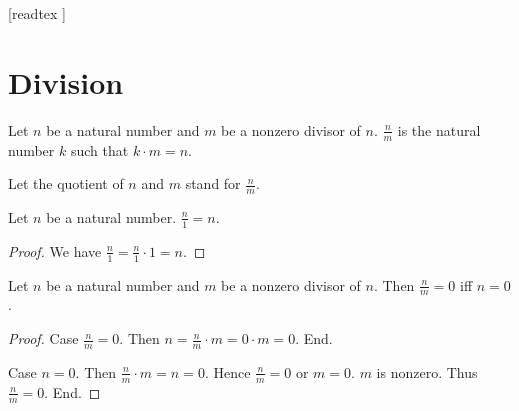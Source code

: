 \documentclass[10pt]{article}
\begin{document}
  \begin{imports}
    \begin{forthel}
      [readtex ]
    \end{forthel}
  \end{imports}


  \section*{Division}

  \begin{forthel}
    \begin{definition}[id=ARITHMETIC_14_2313654268297915,printid]
      Let $n$ be a natural number and $m$ be a nonzero divisor of $n$.
      $\frac{n}{m}$ is the natural number $k$ such that $k \cdot m = n$.
    \end{definition}

    Let the quotient of $n$ and $m$ stand for $\frac{n}{m}$.
  \end{forthel}

  \begin{forthel}
    \begin{proposition}[id=ARITHMETIC_14_0843793254698710,printid]
      Let $n$ be a natural number.
      $\frac{n}{1} = n$.
    \end{proposition}
    \begin{proof}
      We have $\frac{n}{1}
        = \frac{n}{1} \cdot 1
        = n$.
    \end{proof}
  \end{forthel}

  \begin{forthel}
    \begin{proposition}[id=ARITHMETIC_14_1254235698632545,printid]
      Let $n$ be a natural number and $m$ be a nonzero divisor of $n$.
      Then $\frac{n}{m} = 0$ iff $n = 0$.
    \end{proposition}
    \begin{proof}
      Case $\frac{n}{m} = 0$.
        Then $n
          = \frac{n}{m} \cdot m
          = 0 \cdot m
          = 0$.
      End.

      Case $n = 0$.
        Then $\frac{n}{m} \cdot m
          = n
          = 0$.
        Hence $\frac{n}{m} = 0$ or $m = 0$.
        $m$ is nonzero.
        Thus $\frac{n}{m} = 0$.
      End.
    \end{proof}
  \end{forthel}
\end{document}
